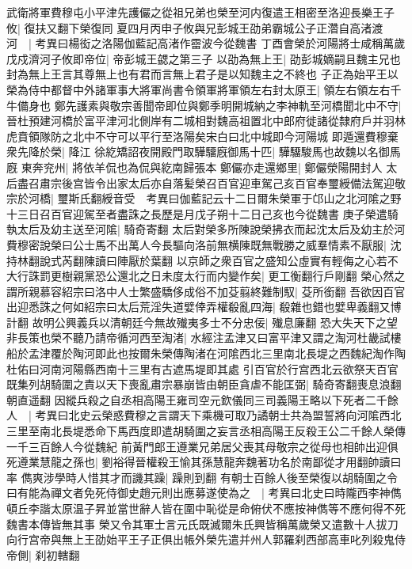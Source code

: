 武衛將軍費穆屯小平津先護儼之從祖兄弟也榮至河内復遣王相密至洛迎長樂王子攸|{
	復扶又翻下榮復同}
夏四月丙申子攸與兄彭城王劭弟霸城公子正濳自高渚渡河　|{
	考異曰楊衒之洛陽伽藍記高渚作霤波今從魏書}
丁酉會榮於河陽將士咸稱萬歲戊戍濟河子攸即帝位|{
	帝彭城王勰之第三子}
以劭為無上王|{
	劭彭城嫡嗣且魏主兄也封為無上王言其尊無上也有君而言無上君子是以知魏主之不終也}
子正為始平王以榮為侍中都督中外諸軍事大將軍尚書令領軍將軍領左右封太原王|{
	領左右領左右千牛備身也}
鄭先護素與敬宗善聞帝即位與鄭季明開城納之李神軌至河橋聞北中不守|{
	晉杜預建河橋於富平津河北側岸有二城相對魏高祖置北中郎府徙諸從隸府戶并羽林虎賁領隊防之北中不守可以平行至洛陽矣宋白曰北中城即今河陽城}
即遁還費穆棄衆先降於榮|{
	降江}
徐紇矯詔夜開殿門取驊驑廐御馬十匹|{
	驊驑駿馬也故魏以名御馬廐}
東奔兖州|{
	將依羊侃也為侃與紇南歸張本}
鄭儼亦走還鄉里|{
	鄭儼滎陽開封人}
太后盡召肅宗後宫皆令出家太后亦自落髪榮召百官迎車駕己亥百官奉璽綬備法駕迎敬宗於河橋|{
	璽斯氏翻綬音受　考異曰伽藍記云十二日爾朱榮軍于邙山之北河隂之野十三日召百官迎駕至者盡誅之長歷是月戊子朔十二日己亥也今從魏書}
庚子榮遣騎執太后及幼主送至河隂|{
	騎奇寄翻}
太后對榮多所陳說榮拂衣而起沈太后及幼主於河費穆密說榮曰公士馬不出萬人今長驅向洛前無横陳既無戰勝之威羣情素不厭服|{
	沈持林翻說式芮翻陳讀曰陣厭於葉翻}
以京師之衆百官之盛知公虛實有輕侮之心若不大行誅罰更樹親黨恐公還北之日未度太行而内變作矣|{
	更工衡翻行戶剛翻}
榮心然之謂所親慕容紹宗曰洛中人士繁盛驕侈成俗不加芟翦終難制馭|{
	芟所銜翻}
吾欲因百官出迎悉誅之何如紹宗曰太后荒淫失道嬖倖弄權殽亂四海|{
	殽雜也錯也嬖卑義翻又博計翻}
故明公興義兵以清朝廷今無故殱夷多士不分忠佞|{
	殱息廉翻}
恐大失天下之望非長策也榮不聽乃請帝循河西至淘渚|{
	水經注孟津又曰富平津又謂之淘河杜畿試樓船於孟津覆於陶河即此也按爾朱榮傳陶渚在河隂西北三里南北長堤之西魏紀淘作陶杜佑曰河南河陽縣西南十三里有古遮馬堤即其處}
引百官於行宫西北云欲祭天百官既集列胡騎圍之責以天下喪亂肅宗暴崩皆由朝臣貪虐不能匡弼|{
	騎奇寄翻喪息浪翻朝直遥翻}
因縱兵殺之自丞相高陽王雍司空元欽儀同三司義陽王略以下死者二千餘人　|{
	考異曰北史云榮惑費穆之言謂天下乘機可取乃譎朝士共為盟誓將向河隂西北三里至南北長堤悉命下馬西度即遣胡騎圍之妄言丞相高陽王反殺王公二千餘人榮傳一千三百餘人今從魏紀}
前黃門郎王遵業兄弟居父喪其母敬宗之從母也相帥出迎俱死遵業慧龍之孫也|{
	劉裕得晉權殺王愉其孫慧龍奔魏著功名於南鄙從才用翻帥讀曰率}
儁爽涉學時人惜其才而譏其躁|{
	躁則到翻}
有朝士百餘人後至榮復以胡騎圍之令曰有能為禪文者免死侍御史趙元則出應募遂使為之　|{
	考異曰北史曰時隴西李神儁頓丘李諧太原温子昇並當世辭人皆在圍中恥從是命俯伏不應按神儁等不應何得不死魏書本傳皆無其事}
榮又令其軍士言元氏既滅爾朱氏興皆稱萬歲榮又遣數十人拔刀向行宫帝與無上王劭始平王子正俱出帳外榮先遣并州人郭羅刹西部高車叱列殺鬼侍帝側|{
	刹初轄翻}
